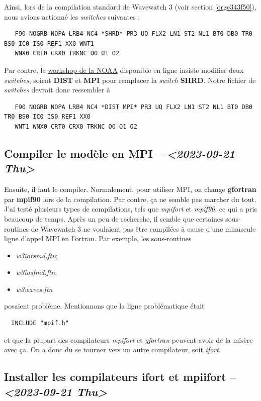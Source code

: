 \documentclass[10pt]{article}
\numberwithin{equation}{section}
\begin{document}
Ainsi, lors de la compilation standard de Wavewatch 3 (voir section \ref{orgc343f50}), nous avions actionné les \emph{switches} suivantes : 
\begin{verbatim}
   F90 NOGRB NOPA LRB4 NC4 *SHRD* PR3 UQ FLX2 LN1 ST2 NL1 BT0 DB0 TR0 BS0 IC0 IS0 REF1 XX0 WNT1
   WNX0 CRT0 CRX0 TRKNC O0 O1 O2
\end{verbatim}

Par contre, le \href{https://polar.ncep.noaa.gov/waves/workshop/pdfs/WW3-workshop-exercises-day4-MPI.pdf}{workshop de la NOAA} disponible en ligne insiste modifier deux \emph{switches}, soient \textbf{DIST} et \textbf{MPI} pour remplacer la \emph{switch} \textbf{SHRD}.
Notre fichier de \emph{switches} devrait donc ressembler à
\begin{verbatim}
   F90 NOGRB NOPA LRB4 NC4 *DIST MPI* PR3 UQ FLX2 LN1 ST2 NL1 BT0 DB0 TR0 BS0 IC0 IS0 REF1 XX0
   WNT1 WNX0 CRT0 CRX0 TRKNC O0 O1 O2
\end{verbatim}

\subsection{Compiler le modèle en MPI -- \textit{<2023-09-21 Thu>}}
\label{sec:org43c2774}
Ensuite, il faut le compiler.
Normalement, pour utiliser MPI, on change \textbf{gfortran} par \textbf{mpif90} lors de la compilation.
Par contre, ça ne semble pas marcher du tout.
J'ai testé plusieurs types de compilations, tels que \emph{mpifort} et \emph{mpif90}, ce qui a pris beaucoup de temps.
Après un peu de recherche, il semble que certaines sous-routines de Wavewatch 3 ne voulaient pas être compilées à cause d'une minuscule ligne d'appel MPI en Fortran.
Par exemple, les sous-routines
\begin{itemize}
\item \emph{w3iorsmd.ftn};
\item \emph{w3iosfmd.ftn};
\item \emph{w3waves.ftn}
\end{itemize}
posaient problème.
Mentionnons que la ligne problématique était
\begin{verbatim}
  INCLUDE "mpif.h"
\end{verbatim}
et que la plupart des compilateurs \emph{mpifort} et \emph{gfortran} peuvent avoir de la misère avec ça.
On a donc du se tourner vers un autre compilateur, soit \emph{ifort}. 


\subsection{Installer les compilateurs ifort et mpiifort -- \textit{<2023-09-21 Thu>}}
\label{sec:orgaf5b074}
\end{document}
